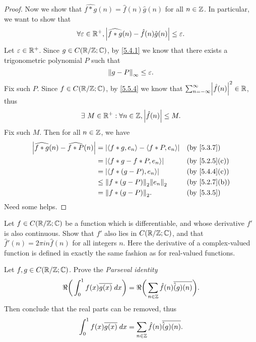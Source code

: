 \begin{proof}
  Now we show that \(\widehat{f * g}(n) = \hat{f}(n) \hat{g}(n)\) for all \(n \in \Z\).
  In particular, we want to show that
  \[
    \forall \varepsilon \in \R^+, \abs{\widehat{f * g}(n) - \hat{f}(n) \hat{g}(n)} \leq \varepsilon.
  \]
  Let \(\varepsilon \in \R^+\).
  Since \(g \in C(\R / \Z ; \C)\), by \cref{5.4.1} we know that there exists a trigonometric polynomial \(P\) such that
  \[
    \norm*{g - P}_{\infty} \leq \varepsilon.
  \]
  Fix such \(P\).
  Since \(f \in C(\R / \Z ; \C)\), by \cref{5.5.4} we know that \(\sum_{n = -\infty}^\infty \abs{\hat{f}(n)}^2 \in \R\), thus
  \[
    \exists\ M \in \R^+ : \forall n \in \Z, \abs{\hat{f}(n)} \leq M.
  \]
  Fix such \(M\).
  Then for all \(n \in \Z\), we have
  \begin{align*}
    \abs{\widehat{f * g}(n) - \widehat{f * P}(n)} & = \abs{\inner*{f * g, e_n} - \inner*{f * P, e_n}} &  & \by{5.3.7}                  \\
                                                  & = \abs{\inner*{f * g - f * P, e_n}}               &  & \text{(by \cref{5.2.5}(c))} \\
                                                  & = \abs{\inner*{f * (g - P), e_n}}                 &  & \text{(by \cref{5.4.4}(c))} \\
                                                  & \leq \norm*{f * (g - P)}_2 \norm*{e_n}_2          &  & \text{(by \cref{5.2.7}(b))} \\
                                                  & = \norm*{f * (g - P)}_2.                          &  & \by{5.3.5}
  \end{align*}
  Need some helps.
\end{proof}

\begin{ex}\label{ex:5.5.4}
  Let \(f \in C(\R / \Z ; \C)\) be a function which is differentiable, and whose derivative \(f'\) is also continuous.
  Show that \(f'\) also lies in \(C(\R / \Z ; \C)\), and that \(\hat{f}'(n) = 2 \pi i n \hat{f}(n)\) for all integers \(n\).
  Here the derivative of a complex-valued function is defined in exactly the same fashion as for real-valued functions.
\end{ex}

\begin{ex}\label{ex:5.5.5}
  Let \(f, g \in C(\R / \Z ; \C)\).
  Prove the \emph{Parseval identity}
  \[
    \Re\bigg(\int_0^1 f(x) \overline{g(x)} \; dx\bigg) = \Re\bigg(\sum_{n \in \Z} \hat{f}(n) \overline{\hat(g)(n)}\bigg).
  \]
  Then conclude that the real parts can be removed, thus
  \[
    \int_0^1 f(x) \overline{g(x)} \; dx = \sum_{n \in \Z} \hat{f}(n) \overline{\hat(g)(n)}.
  \]
\end{ex}

